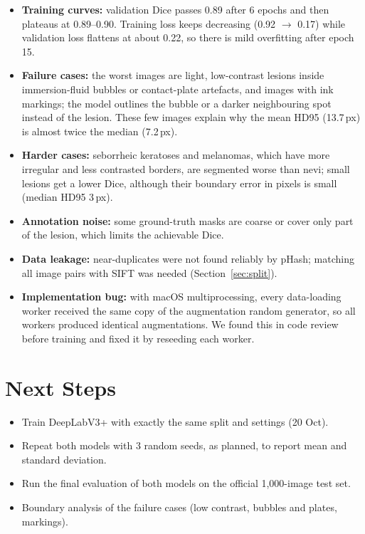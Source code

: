 \documentclass[11pt,a4paper]{article}
\begin{document}
\begin{itemize}[noitemsep]
  \item \textbf{Training curves:} validation Dice passes 0.89 after 6 epochs and then plateaus at
        0.89--0.90. Training loss keeps decreasing (0.92 $\to$ 0.17) while validation loss
        flattens at about 0.22, so there is mild overfitting after epoch 15.
  \item \textbf{Failure cases:} the worst images are light, low-contrast lesions inside
        immersion-fluid bubbles or contact-plate artefacts, and images with ink markings; the
        model outlines the bubble or a darker neighbouring spot instead of the lesion. These few
        images explain why the mean HD95 (13.7\,px) is almost twice the median (7.2\,px).
  \item \textbf{Harder cases:} seborrheic keratoses and melanomas, which have more irregular and
        less contrasted borders, are segmented worse than nevi; small lesions get a lower Dice,
        although their boundary error in pixels is small (median HD95 3\,px).
  \item \textbf{Annotation noise:} some ground-truth masks are coarse or cover only part of the
        lesion, which limits the achievable Dice.
  \item \textbf{Data leakage:} near-duplicates were not found reliably by pHash; matching all
        image pairs with SIFT was needed (Section~\ref{sec:split}).
  \item \textbf{Implementation bug:} with macOS multiprocessing, every data-loading worker
        received the same copy of the augmentation random generator, so all workers produced
        identical augmentations. We found this in code review before training and fixed it by
        reseeding each worker.
\end{itemize}

\section{Next Steps}

\begin{itemize}[noitemsep]
  \item Train DeepLabV3+ with exactly the same split and settings (20 Oct).
  \item Repeat both models with 3 random seeds, as planned, to report mean and standard deviation.
  \item Run the final evaluation of both models on the official 1,000-image test set.
  \item Boundary analysis of the failure cases (low contrast, bubbles and plates, markings).
\end{itemize}
\end{document}
